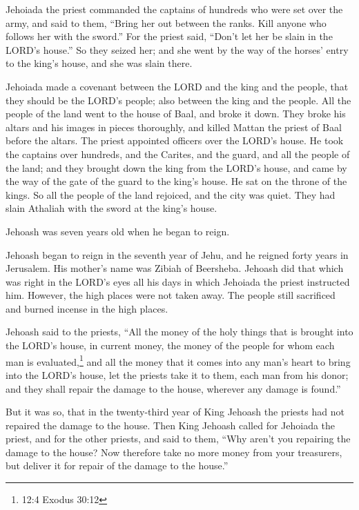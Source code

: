 \myverse{}Jehoiada the priest commanded the captains of hundreds who were
set over the army, and said to them, “Bring her out between the ranks. Kill anyone who follows her with
the sword.” For the priest said, “Don’t let her be slain in the LORD’s house.”
\myverse{}So they seized her; and she went by the way of the horses’ entry to the king’s
house, and she was slain there.

\myverse{}Jehoiada made a covenant between the LORD and the king and the
people, that they should be the LORD’s people; also between the king and the people.
\myverse{}All the people of the land went to the house of Baal, and broke it down.
They broke his altars and his images in pieces thoroughly, and killed Mattan the priest of Baal before
the altars. The priest appointed officers over the LORD’s house.
\myverse{}He took the captains over hundreds, and the Carites, and the guard, and all
the people of the land; and they brought down the king from the LORD’s house, and came by the way of the
gate of the guard to the king’s house. He sat on the throne of the kings.
\myverse{}So all the people of the land rejoiced, and the city was quiet. They had
slain Athaliah with the sword at the king’s house.

\myverse{}Jehoash was seven years old when he began to reign.


\mychapter{} \myverse*{}Jehoash began to reign in the seventh year of Jehu, and he reigned
forty years in Jerusalem. His mother’s name was Zibiah of Beersheba.
\myverse{}Jehoash did that which was right in the LORD’s eyes all his days in which Jehoiada
the priest instructed him.
\myverse{}However, the high places were not taken away. The people still sacrificed and
burned incense in the high places.

\myverse{}Jehoash said to the priests, “All the money of the holy things
that is brought into the LORD’s house, in current money, the money of the people for whom each man is
evaluated,\footnote{12:4 Exodus 30:12} and all the money that it comes into any man’s
heart to bring into the LORD’s house,
\myverse{}let the priests take it to them, each man from his donor; and they shall repair
the damage to the house, wherever any damage is found.”

\myverse{}But it was so, that in the twenty-third year of King Jehoash the
priests had not repaired the damage to the house.
\myverse{}Then King Jehoash called for Jehoiada the priest, and for the other priests,
and said to them, “Why aren’t you repairing the damage to the house? Now therefore take no more money
from your treasurers, but deliver it for repair of the damage to the house.”

